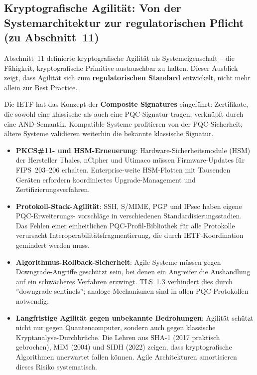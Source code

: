 ﻿\documentclass[a4paper,12pt]{article}
\theoremstyle{definition}
\begin{document}
\subsection{Kryptografische Agilität: Von der Systemarchitektur zur regulatorischen Pflicht (zu Abschnitt~11)}

Abschnitt~11 definierte kryptografische Agilität als
Systemeigenschaft -- die Fähigkeit, kryptografische Primitive
austauschbar zu halten. Dieser Ausblick zeigt, dass Agilität
sich zum \textbf{regulatorischen Standard} entwickelt, nicht
mehr allein zur Best Practice.

Die IETF hat das Konzept der \textbf{Composite Signatures}
eingeführt: Zertifikate, die sowohl eine klassische als auch
eine PQC-Signatur tragen, verknüpft durch eine AND-Semantik.
Kompatible Systeme profitieren von der PQC-Sicherheit;
ältere Systeme validieren weiterhin die bekannte klassische Signatur.

\begin{itemize}
  \item \textbf{PKCS\#11- und HSM-Erneuerung}:
    Hardware-Sicherheitsmodule (HSM) der Hersteller Thales, nCipher
    und Utimaco müssen Firmware-Updates für FIPS~203--206 erhalten.
    Enterprise-weite HSM-Flotten mit Tausenden Geräten erfordern
    koordiniertes Upgrade-Management und Zertifizierungsverfahren.
  \item \textbf{Protokoll-Stack-Agilität}:
    SSH, S/MIME, PGP und IPsec haben eigene PQC-Erweiterungs-
    vorschläge in verschiedenen Standardisierungsstadien.
    Das Fehlen einer einheitlichen PQC-Profil-Bibliothek für
    alle Protokolle verursacht Interoperabilitätsfragmentierung,
    die durch IETF-Koordination gemindert werden muss.
  \item \textbf{Algorithmus-Rollback-Sicherheit}:
    Agile Systeme müssen gegen Downgrade-Angriffe geschützt sein,
    bei denen ein Angreifer die Aushandlung auf ein schwächeres
    Verfahren erzwingt. TLS~1.3 verhindert dies durch
    ''downgrade sentinels''; analoge Mechanismen sind in allen
    PQC-Protokollen notwendig.
  \item \textbf{Langfristige Agilität gegen unbekannte Bedrohungen}:
    Agilität schützt nicht nur gegen Quantencomputer, sondern auch
    gegen klassische Kryptanalyse-Durch\-brüche. Die Lehren aus
    SHA-1 (2017 praktisch gebrochen), MD5 (2004) und SIDH (2022)
    zeigen, dass kryptografische Algorithmen unerwartet fallen können.
    Agile Architekturen amortisieren dieses Risiko systematisch.
\end{itemize}
\end{document}

